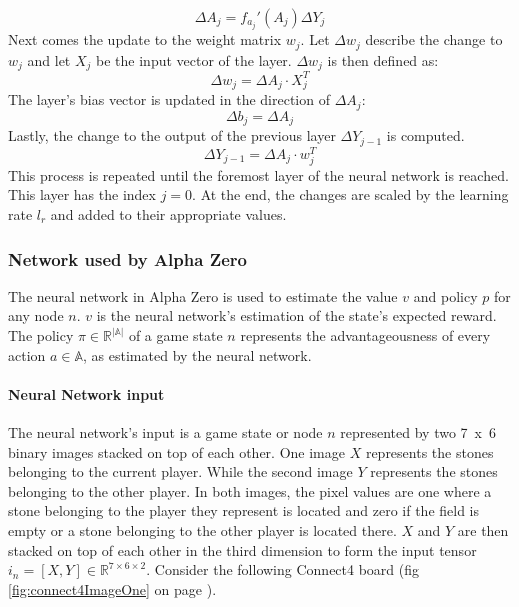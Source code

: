 \documentclass[12pt]{article}
\newcommand{\imgRef}[1]{(fig \ref{#1} on page \pageref{#1})}
\begin{document}
\begin{equation}\label{eq:NN:deltaA}
\Delta A_j = f_{a_j}'(A_j)\Delta Y_j
\end{equation}
Next comes the update to the weight matrix \(w_j\). Let \(\Delta w_j\) describe the change to \(w_j\) and let \(X_j\) be the input vector of the layer. \(\Delta w_j\) is then defined as:
\begin{equation}\label{eq:NN:deltaW}
\Delta w_j = \Delta A_j \cdot X_j^T
\end{equation}
The layer's bias vector is updated in the direction of \(\Delta A_j\):
\begin{equation}\label{eq:NN:deltaB}
\Delta b_j = \Delta A_j
\end{equation}
Lastly, the change to the output of the previous layer \(\Delta Y_{j-1}\) is computed.
\begin{equation} \label{eq:NN:deltaA_lastLayer}
\Delta Y_{j-1} = \Delta A_j \cdot w_j^T
\end{equation}
This process is repeated until the foremost layer of the neural network is reached. This layer has the index \(j=0\). At the end, the changes are scaled by the learning rate \(l_r\) and added to their appropriate values.\\

\subsubsection{Network used by Alpha Zero}
The neural network in Alpha Zero is used to estimate the value \(v\) and policy \(p\) for any node \(n\). \(v\) is the neural network's estimation of the state's expected reward. The policy \(\pi \in\mathbb{R}^{|\mathbb{A}|}\) of a game state \(n\) represents the advantageousness of every action \(a\in\mathbb{A}\), as estimated by the neural network.
\paragraph{Neural Network input}\label{sec:neuralNetworkInput}
The neural network's input is a game state or node \(n\) represented by two \mbox{7 x 6} binary images stacked on top of each other. One image \(X\) represents the stones belonging to the current player. While the second image \(Y\) represents the stones belonging to the other player. In both images, the pixel values are one where a stone belonging to the player they represent is located and zero if the field is empty or a stone belonging to the other player is located there. \(X\) and \(Y\) are then stacked on top of each other in the third dimension to form the input tensor \(i_n = [X, Y] \in \mathbb{R}^{7 \times 6 \times 2}\).
Consider the following Connect4 board \imgRef{fig:connect4ImageOne}.
\end{document}
